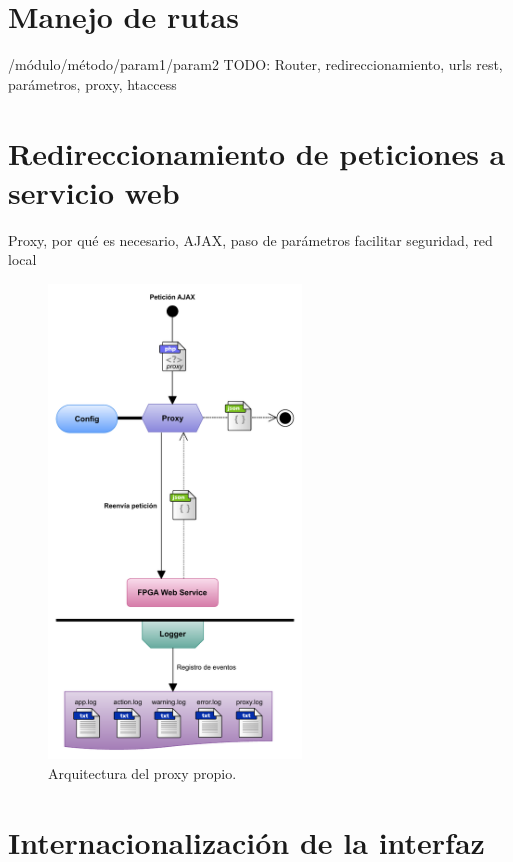 \section{Manejo de rutas\label{extra:mvc:router}}

/módulo/método/param1/param2
TODO: Router, redireccionamiento, urls rest, parámetros, proxy, htaccess

\section{Redireccionamiento de peticiones a servicio web\label{extra:mvc:proxy}}

Proxy, por qué es necesario, AJAX, paso de parámetros
facilitar seguridad, red local

\begin{figure}[!htp]
  \centering
  \includegraphics[width=0.6\textwidth,clip=true]{graphics/proxy}
  \caption{Arquitectura del proxy propio.}
  \label{fig:proxy}
\end{figure}

\section{Internacionalización de la interfaz\label{extra:mvc:i18n}}

